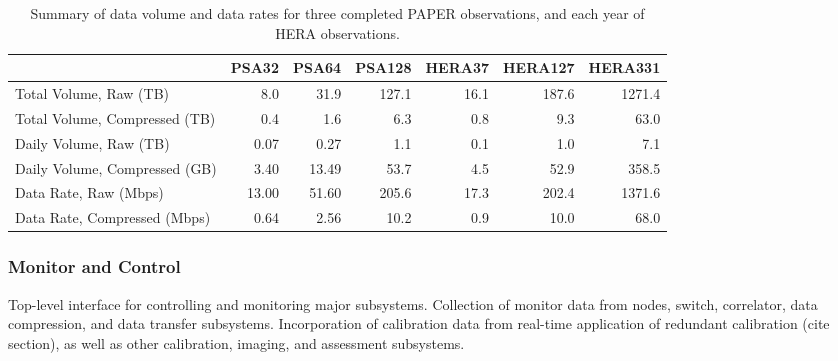 \documentclass[preprint]{aastex}
\begin{document}
%
%

\begin{table}
\begin{tabular}{| l | r r r r r r |}
    \hline
                                      & PSA32 & PSA64 & PSA128 & HERA37 & HERA127 & HERA331 \\ \hline
               Total Volume, Raw (TB) &   8.0 &  31.9 &  127.1 &   16.1 &   187.6 &  1271.4 \\
        Total Volume, Compressed (TB) &   0.4 &   1.6 &    6.3 &    0.8 &     9.3 &    63.0 \\
               Daily Volume, Raw (TB) &  0.07 &  0.27 &    1.1 &    0.1 &     1.0 &     7.1 \\
        Daily Volume, Compressed (GB) &  3.40 & 13.49 &   53.7 &    4.5 &    52.9 &   358.5 \\
                Data Rate, Raw (Mbps) & 13.00 & 51.60 &  205.6 &   17.3 &   202.4 &  1371.6 \\
         Data Rate, Compressed (Mbps) &  0.64 &  2.56 &   10.2 &    0.9 &    10.0 &    68.0 \\
    \hline
\end{tabular}
\caption{\label{tab:data_vol} Summary of data volume and data rates for three completed PAPER observations, and each year of HERA observations.}
\end{table}

\subsubsection{Monitor and Control}


Top-level interface for controlling and monitoring major subsystems. 
Collection of monitor data from nodes, switch, correlator, data compression, and data transfer subsystems.
Incorporation of calibration data from real-time application of redundant calibration (cite section), as well as
other calibration, imaging, and assessment subsystems.

\end{document}

